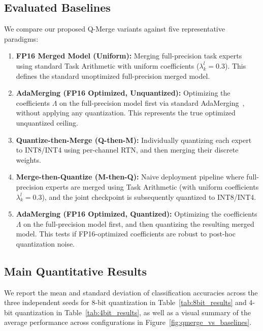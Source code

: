 \subsection{Evaluated Baselines}
We compare our proposed Q-Merge variants against five representative paradigms:
\begin{enumerate}
    \item \textbf{FP16 Merged Model (Uniform):} Merging full-precision task experts using standard Task Arithmetic with uniform coefficients ($\lambda^l_k = 0.3$). This defines the standard unoptimized full-precision merged model.
    \item \textbf{AdaMerging (FP16 Optimized, Unquantized):} Optimizing the coefficients $\Lambda$ on the full-precision model first via standard AdaMerging~\cite{yang2024adamerging}, without applying any quantization. This represents the true optimized unquantized ceiling.
    \item \textbf{Quantize-then-Merge (Q-then-M):} Individually quantizing each expert to INT8/INT4 using per-channel RTN, and then merging their discrete weights.
    \item \textbf{Merge-then-Quantize (M-then-Q):} Naive deployment pipeline where full-precision experts are merged using Task Arithmetic (with uniform coefficients $\lambda^l_k = 0.3$), and the joint checkpoint is subsequently quantized to INT8/INT4.
    \item \textbf{AdaMerging (FP16 Optimized, Quantized):} Optimizing the coefficients $\Lambda$ on the full-precision model first, and then quantizing the resulting merged model. This tests if FP16-optimized coefficients are robust to post-hoc quantization noise.
\end{enumerate}

\subsection{Main Quantitative Results}
We report the mean and standard deviation of classification accuracies across the three independent seeds for 8-bit quantization in Table~\ref{tab:8bit_results} and 4-bit quantization in Table~\ref{tab:4bit_results}, as well as a visual summary of the average performance across configurations in Figure~\ref{fig:qmerge_vs_baselines}.

